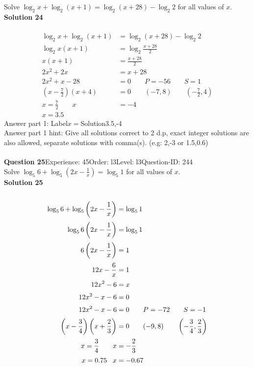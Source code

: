 \documentclass{article}
\begin{document}
Solve $\log_{2}x+\log_{2}(x+1)=\log_{2}(x+28)-\log_{2}2$ for all values of $x$.\\[4pt]
\noindent\textbf{Solution 24}\\[2pt]
\\[-35pt]\begin{align*}
\log_{2}x+\log_{2}(x+1)&=\log_{2}(x+28)-\log_{2}2\\[2pt]
\log_{2}x(x+1)&=\log_{2}\displaystyle\frac{x+28}{2}\\[2pt]
x(x+1)&=\displaystyle\frac{x+28}{2}\\[2pt]
2x^2+2x&=x+28\\[2pt]
2x^2+x-28&=0\qquad P=-56 \qquad S=1\\[2pt]
\left(x-\displaystyle\frac{7}{2}\right)(x+4)&=0\qquad (-7,8) \qquad \left(-\displaystyle\frac{7}{2},4\right)\\[2pt]
x=\displaystyle\frac{7}{2}\qquad x&=-4\\[2pt]
x=3.5\hspace{21pt}&
\end{align*}
Answer part 1: \hspace{10pt}Label\hspace{10pt}$x=$\hspace{10pt}Solution\hspace{10pt}3.5,-4\\
Answer part 1 hint: \hspace{15pt} Give all solutions correct to 2 d.p, exact integer solutions are also allowed, separate solutions with comma(s). (e.g: 2,-3 or 1.5,0.6)\\
\\[4pt]
\noindent\textbf{Question 25}\hspace{20pt}Experience: 45\hspace{20pt}Order: l3\hspace{20pt}Level: l3\hspace{20pt}Question-ID: 244\\[2pt]
Solve $\log_{5}6+\log_{5}\left(2x-\displaystyle\frac{1}{x}\right)=\log_{5}1$ for all values of $x$.\\[4pt]
\noindent\textbf{Solution 25}\\[2pt]
\\[-35pt]\begin{align*}
\log_{5}6+\log_{5}\left(2x-\displaystyle\frac{1}{x}\right)&=\log_{5}1\\[2pt]
\log_{5}6\left(2x-\displaystyle\frac{1}{x}\right)&=\log_{5}1\\[2pt]
6\left(2x-\displaystyle\frac{1}{x}\right)&=1\\[2pt]
12x-\displaystyle\frac{6}{x}&=1\\[2pt]
12x^2-6&=x\\[2pt]
12x^2-x-6&=0\\[2pt]
12x^2-x-6&=0\qquad P=-72 \qquad S=-1\\[2pt]
\left(x-\displaystyle\frac{3}{4}\right)\left(x+\displaystyle\frac{2}{3}\right)&=0\qquad (-9,8)\qquad \left(-\displaystyle\frac{3}{4},\displaystyle\frac{2}{3}\right)\\[2pt]
x=\displaystyle\frac{3}{4}\qquad x&=-\displaystyle\frac{2}{3}\\[2pt]
x=0.75\hspace{8.5pt}x&=-0.67
\end{align*}
\end{document}
